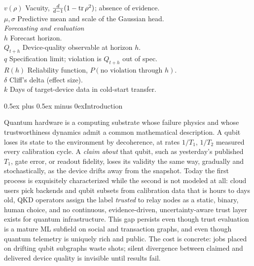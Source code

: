 \documentclass[journal]{IEEEtran}
\makeatletter
\def\section{\@startsection{section}{1}{\z@}{1.8ex plus 1ex minus 0.75ex}%
{0.5ex plus 0.5ex minus 0ex}{\normalfont\normalsize\centering\scshape}}
\makeatother
\begin{document}
{\begin{tabbing}
$v(\rho)$ \> Vacuity, $\tfrac{d}{d-1}(1-\tr\rho^2)$; absence of evidence.\\
$\mu,\sigma$ \> Predictive mean and scale of the Gaussian head.\\[3.5pt]
\textit{Forecasting and evaluation}\\[2pt]
$h$ \> Forecast horizon.\\
$Q_{t+h}$ \> Device-quality observable at horizon $h$.\\
$q$ \> Specification limit; violation is $Q_{t+h}$ out of spec.\\
$R(h)$ \> Reliability function, $P(\text{no violation through } h)$.\\
$\delta$ \> Cliff's delta (effect size).\\
$k$ \> Days of target-device data in cold-start transfer.
\end{tabbing}}

\section{Introduction}\label{sec:intro}

Quantum hardware is a computing substrate whose failure physics and whose
trustworthiness dynamics admit a common mathematical description. A qubit loses
its state to the environment by decoherence, at rates $1/T_1$, $1/T_2$ measured
every calibration cycle. A \emph{claim about} that qubit, such as yesterday's
published $T_1$, gate error, or readout fidelity, loses its validity the same way,
gradually and stochastically, as the device drifts away from the snapshot. Today the
first process is exquisitely characterized while the second is not modeled at all:
cloud users pick backends and qubit subsets from calibration data that is hours to
days old, QKD operators assign the label \emph{trusted} to relay nodes as a static,
binary, human choice, and no continuous, evidence-driven, uncertainty-aware trust
layer exists for quantum infrastructure. This gap persists even though trust
evaluation is a mature ML subfield on social and transaction graphs, and even though
quantum telemetry is uniquely rich and public. The cost is concrete: jobs placed on
drifting qubit subgraphs waste shots; silent divergence between claimed and delivered
device quality is invisible until results fail.
\end{document}
